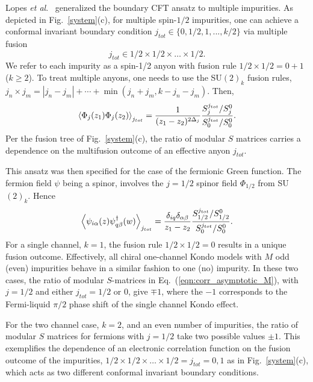 \documentclass[aps,prb,twocolumn,superscriptaddress]{revtex4-1}
\newcommand{\be}{\begin{equation}}
\newcommand{\ee}{\end{equation}}
\begin{document}
Lopes \textit{et al}.~\cite{lopes2020anyons} generalized the boundary CFT ansatz to multiple impurities. As depicted in Fig.~\ref{system}(c), for multiple spin-$1/2$ impurities, one can achieve a conformal invariant boundary condition $j_{tot} \in \{0, 1/2, 1, ..., k/2 \}$ via multiple fusion
\be
j_{tot} \in    1/2 \times 1/2 \times \dots \times 1/2 .
\ee
We refer to each impurity as a spin-1/2 anyon with fusion rule $1/2 \times 1/2=0+1$ ($k \ge 2$). To treat multiple anyons, one needs to use the  SU$(2)_k$ fusion rules, $j_n \times j_m =|j_n-j_m| + \cdots + \min(j_n+j_m,k-j_n-j_m)$.
Then,
\begin{eqnarray}
\braket{\Phi_{j}(z_{1})\Phi_{j}(z_{2})}_{j_{tot}}=\frac{1}{(z_{1}-z_{2})^{2\Delta_{j}}}\frac{S_{j}^{j_{tot}}/S_{j}^{0}}{S_{0}^{j_{tot}}/S_{0}^{0}}. \label{eqn:corr_asymptotic_M}
\end{eqnarray}
Per the fusion tree of Fig.~\ref{system}(c), the ratio of modular $S$ matrices carries a dependence on the multifusion outcome of an effective anyon $j_{tot}$.


This ansatz was then specified for the case of the fermionic Green function. The fermion field $\psi$ being a spinor, involves the $j=1/2$ spinor field $\Phi_{1/2}$ from SU$(2)_k$. Hence~\cite{lopes2020anyons}
\begin{eqnarray}
\Bigl\langle{\psi_{i\alpha}(z)\psi_{q\beta}^{\dagger}(w)\Bigr\rangle}_{j_{tot}}=\frac{\delta_{i q} \delta_{\alpha \beta}}{z_{1}-z_{2}}\frac{S_{1/2}^{j_{tot}}/S_{1/2}^{0}}{S_{0}^{j_{tot}}/S_{0}^{0}}.
\end{eqnarray}
 For a single channel, $k=1$, the fusion rule $1/2\times1/2=0$ results in a unique fusion outcome. Effectively, all chiral one-channel Kondo models with $M$ odd (even) impurities behave in a similar fashion to one (no) impurity. In these two cases, the ratio of modular $S$-matrices in Eq.~(\ref{eqn:corr_asymptotic_M}), with $j=1/2$ and either $j_{tot}=1/2$ or $0$, give $\mp 1$, where the $-1$ corresponds to the Fermi-liquid $\pi/2$ phase shift of the single channel Kondo effect.

For the two channel case, $k=2$, and an even number of impurities, the ratio of modular $S$ matrices for fermions with $j=1/2$ take two possible values $\pm1$. 
This exemplifies the dependence of an electronic correlation function  on the fusion outcome of the impurities, $1/2\times1/2\times\dots\times1/2=j_{tot}=0,1$ as in Fig.~\ref{system}(c), which acts as two different conformal invariant boundary conditions. 

\end{document}
